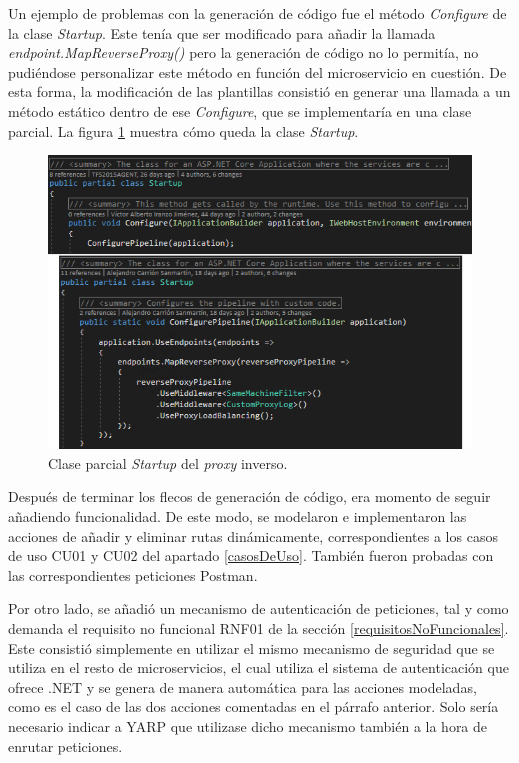 \documentclass[11pt,spanish,listoffigures]{tfgetsinf}
\begin{document}
Un ejemplo de problemas con la generación de código fue el método \emph{Configure} de la clase \emph{Startup}. Este tenía que ser modificado para añadir la llamada \emph{endpoint.MapReverseProxy()} pero la generación de código no lo permitía, no pudiéndose personalizar este método en función del microservicio en cuestión. De esta forma, la modificación de las plantillas consistió en generar una llamada a un método estático dentro de ese \emph{Configure}, que se implementaría en una clase parcial. La figura \ref{startup} muestra cómo queda la clase \emph{Startup}.

\begin{figure}[ht]
\centering
\includegraphics[width=1\textwidth]{imagenes/startup}
\caption{Clase parcial \emph{Startup} del \emph{proxy} inverso.}
	\label{startup}
\end{figure}

Después de terminar los flecos de generación de código, era momento de seguir añadiendo funcionalidad. De este modo, se modelaron e implementaron las acciones de añadir y eliminar rutas dinámicamente, correspondientes a los casos de uso CU01 y CU02 del apartado \ref{casosDeUso}. También fueron probadas con las correspondientes peticiones Postman.

Por otro lado, se añadió un mecanismo de autenticación de peticiones, tal y como demanda el requisito no funcional RNF01 de la sección \ref{requisitosNoFuncionales}. Este consistió simplemente en utilizar el mismo mecanismo de seguridad que se utiliza en el resto de microservicios, el cual utiliza el sistema de autenticación que ofrece .NET y se genera de manera automática para las acciones modeladas, como es el caso de las dos acciones comentadas en el párrafo anterior. Solo sería necesario indicar a YARP que utilizase dicho mecanismo también a la hora de enrutar peticiones.
\end{document}
